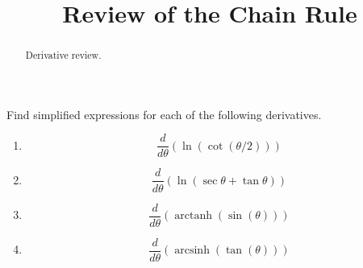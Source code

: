 \documentclass{ximera}
\title{Review of the Chain Rule}
\begin{document}
\begin{abstract}
Derivative review.
\end{abstract}
\maketitle


\begin{question}  \label{Q9edRersfrre}
Find simplified expressions for each of the following derivatives.

\begin{enumerate}

\item
\[
\frac{d}{d\theta}\left( \ln (\cot (\theta/2)) \right)
\]

\item 
\[
\frac{d}{d\theta}\left( \ln (\sec\theta + \tan\theta) \right)
\]

\item 
\[
\frac{d}{d\theta}\left( \operatorname{arctanh}(\sin(\theta)) \right)
\]

\item 
\[
\frac{d}{d\theta}\left( \operatorname{arcsinh}(\tan(\theta)) \right)
\]

\end{enumerate}

\end{question}
\end{document}

